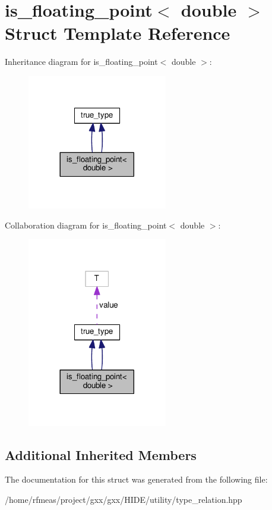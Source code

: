 \hypertarget{structis__floating__point_3_01double_01_4}{}\section{is\+\_\+floating\+\_\+point$<$ double $>$ Struct Template Reference}
\label{structis__floating__point_3_01double_01_4}


Inheritance diagram for is\+\_\+floating\+\_\+point$<$ double $>$\+:
\nopagebreak
\begin{figure}[H]
\begin{center}
\leavevmode
\includegraphics[width=173pt]{structis__floating__point_3_01double_01_4__inherit__graph}
\end{center}
\end{figure}


Collaboration diagram for is\+\_\+floating\+\_\+point$<$ double $>$\+:
\nopagebreak
\begin{figure}[H]
\begin{center}
\leavevmode
\includegraphics[width=173pt]{structis__floating__point_3_01double_01_4__coll__graph}
\end{center}
\end{figure}
\subsection*{Additional Inherited Members}


The documentation for this struct was generated from the following file\+:\begin{DoxyCompactItemize}
\item 
/home/rfmeas/project/gxx/gxx/\+H\+I\+D\+E/utility/type\+\_\+relation.\+hpp\end{DoxyCompactItemize}
